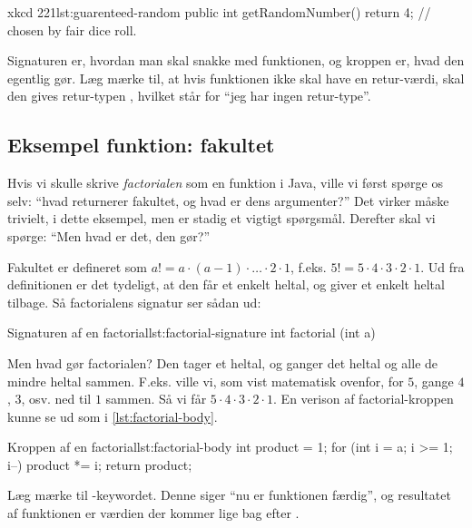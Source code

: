		\begin{JavaCode}{xkcd 221}{lst:guarenteed-random}
			public int getRandomNumber() {
				return 4; // chosen by fair dice roll.
			}
		\end{JavaCode}

        Signaturen er, hvordan man skal snakke med funktionen, og
        kroppen er, hvad den egentlig gør. Læg mærke til, at hvis
        funktionen ikke skal have en retur-værdi, skal den gives
        retur-typen , hvilket står for ``jeg har ingen retur-type''.

	\subsection{Eksempel funktion: fakultet}

        Hvis vi skulle skrive \emph{\gls{factorial}en} som en
        funktion i Java, ville vi først spørge os selv: ``hvad
        returnerer fakultet, og hvad er dens argumenter?'' Det virker
        måske trivielt, i dette eksempel, men er stadig et vigtigt
        spørgsmål. Derefter skal vi spørge: ``Men hvad er det, den
        gør?''

        Fakultet er defineret som \(a! = a \cdot (a-1) \cdot \dots
        \cdot 2 \cdot 1\), f.eks. \(5! = 5 \cdot 4 \cdot 3 \cdot 2
        \cdot 1\). Ud fra definitionen er det tydeligt, at den får et
        enkelt heltal, og giver et enkelt heltal tilbage. Så
        \gls{factorial}ens signatur ser sådan ud:

		\begin{JavaCode}{Signaturen af en \gls{factorial}}{lst:factorial-signature}
			int factorial (int a)
		\end{JavaCode}

		Men hvad gør \gls{factorial}en? Den tager et heltal, og ganger det heltal og alle de mindre heltal sammen. F.eks. ville vi, som vist matematisk ovenfor, for $5$, gange $4$, $3$, osv. ned til $1$ sammen. Så vi får $5\cdot4\cdot3\cdot2\cdot1$. En verison af \gls{factorial}-kroppen kunne se ud som i \autoref{lst:factorial-body}.

		\begin{JavaCode}{Kroppen af en \gls{factorial}}{lst:factorial-body}
			int product = 1;
			for (int i = a; i >= 1; i--)
				product *= i;
			return product;
		\end{JavaCode}

        Læg mærke til -keywordet. Denne siger ``nu
        er funktionen færdig'', og resultatet af funktionen er værdien
        der kommer lige bag efter .

